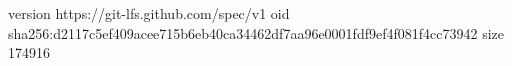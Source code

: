 version https://git-lfs.github.com/spec/v1
oid sha256:d2117c5ef409acee715b6eb40ca34462df7aa96e0001fdf9ef4f081f4cc73942
size 174916
